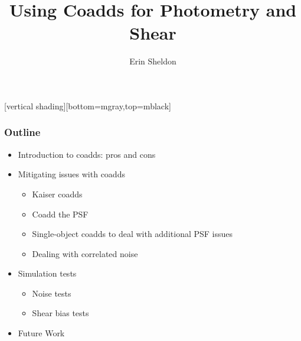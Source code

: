 \documentclass{beamer}
\title{Using Coadds for Photometry and Shear}
\author{Erin Sheldon}
\institute{Brookhaven National Laboratory}
\begin{document}
\frame
{
}
[vertical shading][bottom=mgray,top=mblack]



\frame{\titlepage}




\frame
{
    \frametitle{Outline}

    \begin{itemize}

        \item Introduction to coadds: pros and cons
        \item Mitigating issues with coadds
            \begin{itemize}
                \item Kaiser coadds
                \item Coadd the PSF
                \item Single-object coadds to deal with additional PSF issues
                \item Dealing with correlated noise
            \end{itemize}
        \item Simulation tests
            \begin{itemize}
                \item Noise tests
                \item Shear bias tests
            \end{itemize}
        \item Future Work

    \end{itemize}

}
\end{document}
